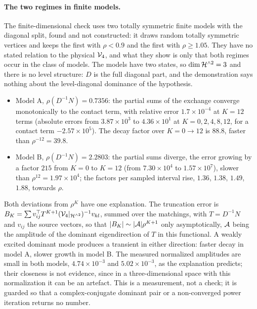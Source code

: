 \paragraph{The two regimes in finite models.}
The finite-dimensional check uses two totally symmetric finite models with the diagonal split, found and not constructed: it draws random totally symmetric vertices and keeps the first with $\rho < 0.9$ and the first with $\rho \ge 1.05$.
They have no stated relation to the physical $\mathcal{V}_{4}$, and what they show is only that both regimes occur in the class of models.
The models have two states, so $\dim \mathcal{H}^{\wedge 2} = 3$ and there is no level structure: $D$ is the full diagonal part, and the demonstration says nothing about the level-diagonal dominance of the hypothesis.
\begin{itemize}
  \setlength{\itemsep}{0.5ex}
  \item Model A, $\rho(D^{-1} N) = 0.7356$: the partial sums of the exchange converge monotonically to the contact term, with relative error $1.7 \times 10^{-4}$ at $K = 12$ terms (absolute errors from $3.87 \times 10^3$ to $4.36 \times 10^1$ at $K = 0, 2, 4, 8, 12$, for a contact term $- 2.57 \times 10^5$). The decay factor over $K = 0 \to 12$ is $88.8$, faster than $\rho^{-12} = 39.8$.
  \item Model B, $\rho(D^{-1} N) = 2.2803$: the partial sums diverge, the error growing by a factor $215$ from $K = 0$ to $K = 12$ (from $7.30 \times 10^4$ to $1.57 \times 10^7$), slower than $\rho^{12} = 1.97 \times 10^4$; the factors per sampled interval rise, $1.36$, $1.38$, $1.49$, $1.88$, towards $\rho$.
\end{itemize}
Both deviations from $\rho^K$ have one explanation.
The truncation error is $B_K = \sum v_{ij}^\top T^{K + 1} (\mathcal{V}_{4}|_{\mathcal{H}^{\wedge 2}})^{-1} v_{kl}$, summed over the matchings, with $T = D^{-1} N$ and $v_{ij}$ the source vectors, so that ${|B_K|} \sim {|{\mathcal{A}}|} \rho^{K + 1}$ only asymptotically, ${\mathcal{A}}$ being the amplitude of the dominant eigendirection of $T$ in this functional.
A weakly excited dominant mode produces a transient in either direction: faster decay in model A, slower growth in model B.
The measured normalized amplitudes are small in both models, $4.74 \times 10^{-3}$ and $5.02 \times 10^{-3}$, as the explanation predicts; their closeness is not evidence, since in a three-dimensional space with this normalization it can be an artefact.
This is a measurement, not a check; it is guarded so that a complex-conjugate dominant pair or a non-converged power iteration returns no number.

